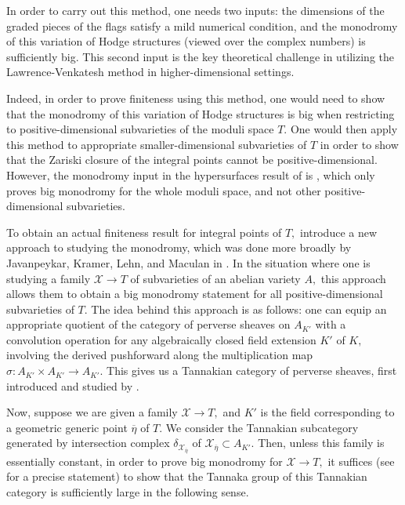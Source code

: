 \documentclass{article}
\theoremstyle{definition}
\theoremstyle{remark}
\begin{document}
\par In order to carry out this method, one needs two inputs: the dimensions of the graded pieces of the flags satisfy a mild numerical condition, and the monodromy of this variation of Hodge structures (viewed over the complex numbers) is sufficiently big. This second input is the key theoretical challenge in utilizing the Lawrence-Venkatesh method in higher-dimensional settings.
\par Indeed, in order to prove finiteness using this method, one would need to show that the monodromy of this variation of Hodge structures is big when restricting to positive-dimensional subvarieties of the moduli space $T.$ One would then apply this method to appropriate smaller-dimensional subvarieties of $T$ in order to show that the Zariski closure of the integral points cannot be positive-dimensional. However, the monodromy input in the hypersurfaces result of \cite{lv18} is \cite{beauville}, which only proves big monodromy for the whole moduli space, and not other positive-dimensional subvarieties.
\par To obtain an actual finiteness result for integral points of $T,$ \cite{ls25} introduce a new approach to studying the monodromy, which was done more broadly by Javanpeykar, Kramer, Lehn, and Maculan in \cite{jklm23}. In the situation where one is studying a family $\mathcal{X} \rightarrow T$ of subvarieties of an abelian variety $A,$ this approach allows them to obtain a big monodromy statement for all positive-dimensional subvarieties of $T.$ The idea behind this approach is as follows: one can equip an appropriate quotient of the category of perverse sheaves on $A_{K'}$ with a convolution operation for any algebraically closed field extension $K'$ of $K,$ involving the derived pushforward along the multiplication map $\sigma: A_{K'} \times A_{K'} \rightarrow A_{K'}.$ This gives us a Tannakian category of perverse sheaves, first introduced and studied by \cite{kram2015}. 
\par Now, suppose we are given a family $\mathcal{X} \rightarrow T,$ and $K'$ is the field corresponding to a geometric generic point $\overline{\eta}$ of $T.$ We consider the Tannakian subcategory generated by intersection complex $\delta_{\mathcal{X}_{\overline{\eta}}}$ of $\mathcal{X}_{\overline{\eta}} \subset A_{K'}.$ Then, unless this family is essentially constant, in order to prove big monodromy for $\mathcal{X} \rightarrow T,$ it suffices (see \cite[Theorem 4.10]{jklm23} for a precise statement) to show that the Tannaka group of this Tannakian category is sufficiently large in the following sense.
\end{document}
